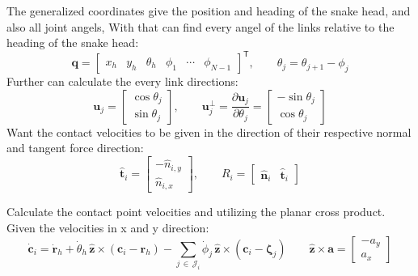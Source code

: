 
The generalized coordinates give the position and heading of the snake head, and also all joint angels, With that can find every angel of the links relative to the heading of the snake head:
\begin{equation}
  \mathbf q = \begin{bmatrix} x_h & y_h & \theta_h & \phi_1 & \cdots & \phi_{N-1} \end{bmatrix}^\mathsf{T},
  \qquad \theta_{j} = \theta_{j+1} - \phi_j
  \label{eq:gen-coords}
\end{equation}
Further can calculate the every link directions:
\begin{equation}
  \mathbf u_j = \begin{bmatrix} \cos\theta_j \\ \sin\theta_j \end{bmatrix},
  \qquad
  \mathbf u_j^{\perp} = \frac{\partial \mathbf u_j}{\partial \theta_j}
  = \begin{bmatrix} -\sin\theta_j \\ \cos\theta_j \end{bmatrix}
  \label{eq:link-dir}
\end{equation}
Want the contact velocities to be given in the direction of their respective normal and tangent force direction:
\begin{equation}
  \hat{\mathbf t}_i = \begin{bmatrix} -\hat n_{i,y} \\ \hat n_{i,x} \end{bmatrix},
  \qquad
  R_i = \begin{bmatrix} \hat{\mathbf n}_i & \hat{\mathbf t}_i \end{bmatrix}
  \label{eq:contact-frame}
\end{equation}

Calculate the contact point velocities and utilizing the planar cross product. Given the velocities in x and y direction: 
\begin{equation}
  \dot{\mathbf c}_i
  = \dot{\mathbf r}_h
  + \dot\theta_h\, \hat{\mathbf z} \times (\mathbf c_i - \mathbf r_h)
  - \sum_{j \,\in\, \mathcal J_i} \dot\phi_j\, \hat{\mathbf z} \times (\mathbf c_i - \boldsymbol\zeta_j)
  \qquad
  \hat{\mathbf z} \times \mathbf a = \begin{bmatrix} -a_y \\ a_x \end{bmatrix}
  \label{eq:contact-vel}
\end{equation}

